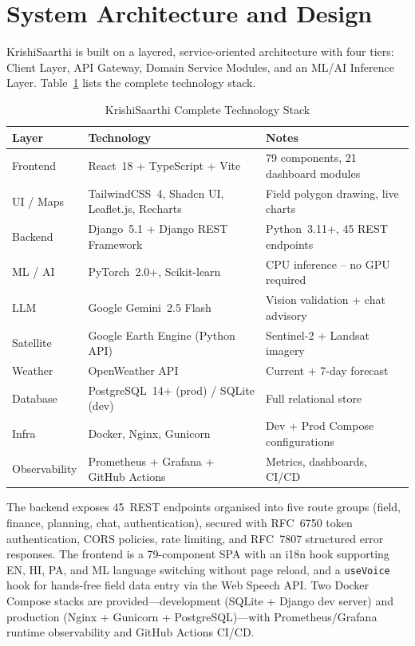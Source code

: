 \documentclass[conference]{IEEEtran}
\begin{document}
\section{System Architecture and Design}
\label{sec:architecture}

KrishiSaarthi is built on a layered, service-oriented architecture with four tiers: Client Layer, API Gateway, Domain Service Modules, and an ML/AI Inference Layer. Table~\ref{tab:techstack} lists the complete technology stack.

\begin{table}[!t]
\caption{KrishiSaarthi Complete Technology Stack}
\label{tab:techstack}
\centering
\renewcommand{\arraystretch}{1.2}
\begin{tabular}{|p{1.3cm}|p{2.6cm}|p{2.6cm}|}
\hline
\textbf{Layer} & \textbf{Technology} & \textbf{Notes} \\
\hline
Frontend & React~18 + TypeScript + Vite & 79 components, 21 dashboard modules \\
\hline
UI / Maps & TailwindCSS~4, Shadcn UI, Leaflet.js, Recharts & Field polygon drawing, live charts \\
\hline
Backend & Django~5.1 + Django REST Framework & Python~3.11+, 45 REST endpoints \\
\hline
ML / AI & PyTorch~2.0+, Scikit-learn & CPU inference -- no GPU required \\
\hline
LLM & Google Gemini~2.5 Flash & Vision validation + chat advisory \\
\hline
Satellite & Google Earth Engine (Python API) & Sentinel-2 + Landsat imagery \\
\hline
Weather & OpenWeather API & Current + 7-day forecast \\
\hline
Database & PostgreSQL~14+ (prod) / SQLite (dev) & Full relational store \\
\hline
Infra & Docker, Nginx, Gunicorn & Dev + Prod Compose configurations \\
\hline
Observability & Prometheus + Grafana + GitHub Actions & Metrics, dashboards, CI/CD \\
\hline
\end{tabular}
\end{table}

The backend exposes 45~REST endpoints organised into five route groups (field, finance, planning, chat, authentication), secured with RFC~6750 token authentication, CORS policies, rate limiting, and RFC~7807 structured error responses. The frontend is a 79-component SPA with an i18n hook supporting EN, HI, PA, and ML language switching without page reload, and a \texttt{useVoice} hook for hands-free field data entry via the Web Speech API. Two Docker Compose stacks are provided---development (SQLite + Django dev server) and production (Nginx + Gunicorn + PostgreSQL)---with Prometheus/Grafana runtime observability and GitHub Actions CI/CD.
\end{document}
